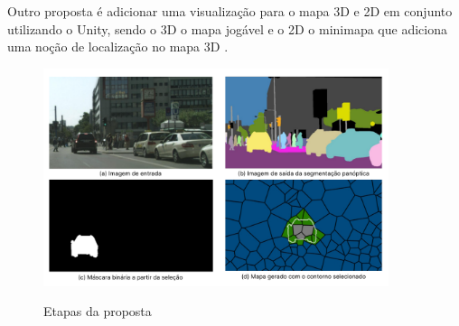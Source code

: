 Outro proposta é adicionar uma visualização para o mapa 3D e 2D em conjunto utilizando o Unity, sendo o 3D o mapa jogável e o 2D o minimapa que adiciona uma noção de localização no mapa 3D \cite{amitp2010,firstPersonMovement}.

%




\begin{figure}[!ht]
	\centering
    \caption{Etapas da proposta}
	\includegraphics[width=0.9\textwidth]{figures/etapas_proposta.png}
	\label{fig:etapas_proposta}
\end{figure}





